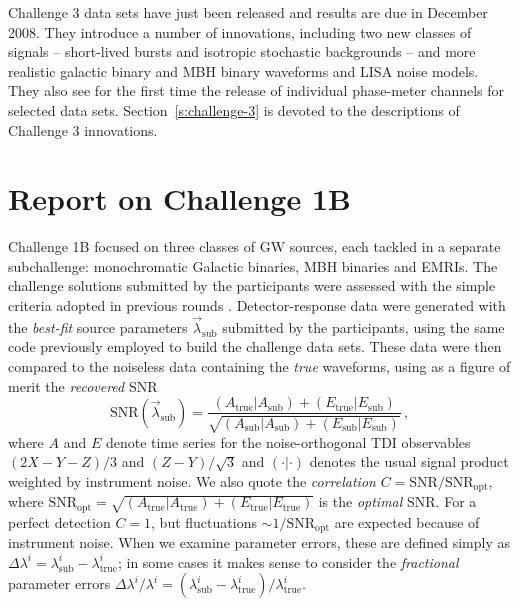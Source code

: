 \documentclass{iopart}
\begin{document}
Challenge 3 data sets have just been released and results are due in December 2008. They introduce a number of innovations, including two new classes of signals -- short-lived bursts and isotropic stochastic backgrounds -- and more realistic galactic binary and MBH binary waveforms and LISA noise models. They also see for the first time the release of individual phase-meter channels for selected data sets. Section~\ref{s:challenge-3} is devoted to the descriptions of Challenge 3 innovations.


\section{Report on Challenge 1B}
\label{s:challenge-1b}

Challenge 1B focused on three classes of GW sources, each tackled in a separate subchallenge: monochromatic Galactic binaries, MBH binaries and EMRIs. The challenge solutions submitted by the participants were assessed with the simple criteria adopted in previous rounds \cite{mldcgwdaw1, mldcamaldi2}. Detector-response data were generated with the \emph{best-fit} source parameters $\vec{\lambda}_\mathrm{sub}$ submitted by the participants, using the same code previously employed to build the challenge data sets. These data were then compared to the noiseless data containing the \emph{true} waveforms, using as a figure of merit the \emph{recovered} SNR
%
\begin{equation}
\mathrm{SNR}(\vec{\lambda}_\mathrm{sub}) = \frac{(A_\mathrm{true}|A_\mathrm{sub}) + (E_\mathrm{true}|E_\mathrm{sub})} {\sqrt{(A_\mathrm{sub}|A_\mathrm{sub}) + (E_\mathrm{sub}|E_\mathrm{sub})}}\,,
\label{e:SNR}
\end{equation}
%
where $A$ and $E$ denote time series for the noise-orthogonal TDI observables $(2X - Y - Z)/3$ and $(Z - Y)/\sqrt{3}$ \cite{sensitivity} and $(\cdot|\cdot)$ denotes the usual signal product weighted by instrument noise.
We also quote the \emph{correlation} $C = \mathrm{SNR} / \mathrm{SNR}_\mathrm{opt}$, where 
$\mathrm{SNR}_\mathrm{opt} = \sqrt{(A_\mathrm{true}|A_\mathrm{true}) + (E_\mathrm{true}|E_\mathrm{true})}$ is the \emph{optimal} SNR. For a perfect detection $C = 1$, but fluctuations $\sim 1 / \mathrm{SNR}_\mathrm{opt}$ are expected because of instrument noise. When we examine parameter errors, these are defined simply as
$\Delta\lambda^i = \lambda^i_\mathrm{sub} - \lambda^i_\mathrm{true}$; in some cases it makes sense to consider the \emph{fractional} parameter errors $\Delta \lambda^i / \lambda^i = (\lambda^i_\mathrm{sub} - \lambda^i_\mathrm{true}) / \lambda^i_\mathrm{true}$.
\end{document}
